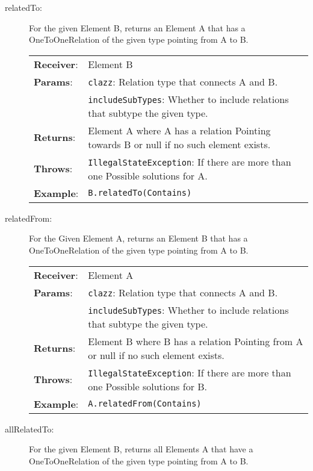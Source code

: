 \begin{description}
  \item[relatedTo:] For the given Element B, returns an Element A that has a OneToOneRelation of the given type pointing from A to B.

        \begin{tabularx}{\linewidth}{ l X }
          \textbf{Receiver}: & Element B
          \\
          \textbf{Params}:   & \texttt{clazz}: Relation type that connects A and B.
          \\
                             & \texttt{includeSubTypes}: Whether to include relations that subtype the given type.
          \\
          \textbf{Returns}:  & Element A where A has a relation Pointing towards B or null if no such element exists.
          \\
          \textbf{Throws}:   & \texttt{IllegalStateException}: If there are more than one Possible solutions for A.
          \\
          \textbf{Example}:  & \texttt{B.relatedTo(Contains)}
        \end{tabularx}

  \item[relatedFrom:] For the Given Element A, returns an Element B that has a OneToOneRelation of the given type pointing from A to B.

        \begin{tabularx}{\linewidth}{ l X }
          \textbf{Receiver}: & Element A
          \\
          \textbf{Params}:   & \texttt{clazz}: Relation type that connects A and B.
          \\
                             & \texttt{includeSubTypes}: Whether to include relations that subtype the given type.
          \\
          \textbf{Returns}:  & Element B where B has a relation Pointing from A or null if no such element exists.
          \\
          \textbf{Throws}:   & \texttt{IllegalStateException}: If there are more than one Possible solutions for B.
          \\
          \textbf{Example}:  & \texttt{A.relatedFrom(Contains)}
        \end{tabularx}

\clearpage
  \item[allRelatedTo:] For the given Element B, returns all Elements A that have a OneToOneRelation of the given type pointing from A to B.


\end{description}

